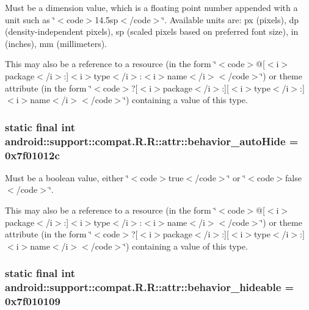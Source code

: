 Must be a dimension value, which is a floating point number appended with a unit such as \char`\"{}$<$code$>$14.5sp$<$/code$>$\char`\"{}. Available units are: px (pixels), dp (density-independent pixels), sp (scaled pixels based on preferred font size), in (inches), mm (millimeters). 

This may also be a reference to a resource (in the form \char`\"{}$<$code$>$@\mbox{[}$<$i$>$package$<$/i$>$:\mbox{]}$<$i$>$type$<$/i$>$:$<$i$>$name$<$/i$>$$<$/code$>$\char`\"{}) or theme attribute (in the form \char`\"{}$<$code$>$?\mbox{[}$<$i$>$package$<$/i$>$:\mbox{]}\mbox{[}$<$i$>$type$<$/i$>$:\mbox{]}$<$i$>$name$<$/i$>$$<$/code$>$\char`\"{}) containing a value of this type. \hypertarget{classandroid_1_1support_1_1compat_1_1_r_1_1attr_bf0d51ee7e2b531c1d9c97c3775de119}{
\subsubsection[{behavior\_\-autoHide}]{\setlength{\rightskip}{0pt plus 5cm}static final int android::support::compat.R.R::attr::behavior\_\-autoHide = 0x7f01012c}}
\label{classandroid_1_1support_1_1compat_1_1_r_1_1attr_bf0d51ee7e2b531c1d9c97c3775de119}


Must be a boolean value, either \char`\"{}$<$code$>$true$<$/code$>$\char`\"{} or \char`\"{}$<$code$>$false$<$/code$>$\char`\"{}. 

This may also be a reference to a resource (in the form \char`\"{}$<$code$>$@\mbox{[}$<$i$>$package$<$/i$>$:\mbox{]}$<$i$>$type$<$/i$>$:$<$i$>$name$<$/i$>$$<$/code$>$\char`\"{}) or theme attribute (in the form \char`\"{}$<$code$>$?\mbox{[}$<$i$>$package$<$/i$>$:\mbox{]}\mbox{[}$<$i$>$type$<$/i$>$:\mbox{]}$<$i$>$name$<$/i$>$$<$/code$>$\char`\"{}) containing a value of this type. \hypertarget{classandroid_1_1support_1_1compat_1_1_r_1_1attr_cf37d939f580f4f12fb1ece25f1c9d74}{
\subsubsection[{behavior\_\-hideable}]{\setlength{\rightskip}{0pt plus 5cm}static final int android::support::compat.R.R::attr::behavior\_\-hideable = 0x7f010109}}
\label{classandroid_1_1support_1_1compat_1_1_r_1_1attr_cf37d939f580f4f12fb1ece25f1c9d74}


